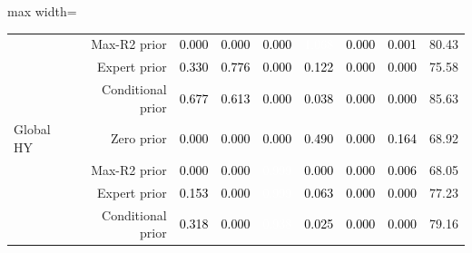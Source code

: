 \documentclass[a4paper,review]{cas-sc}
\begin{document}
\begin{table}[pos=htbp]
\begin{adjustbox}{max width=\linewidth}
\begin{tabular}{lrrrrrrrr}
 & Max-R2 prior & \cellcolor[HTML]{FFFFFF}\textcolor{black}{0.000} & \cellcolor[HTML]{FFFFFF}\textcolor{black}{0.000} & \cellcolor[HTML]{FFFFFF}\textcolor{black}{0.000} & \cellcolor[HTML]{C13639}\textcolor{white}{1.068} & \cellcolor[HTML]{FFFFFF}\textcolor{black}{0.000} & \cellcolor[HTML]{F7F6F6}\textcolor{black}{0.001} & 80.43 \\
 & Expert prior & \cellcolor[HTML]{FCD5BF}\textcolor{black}{0.330} & \cellcolor[HTML]{E27B62}\textcolor{black}{0.776} & \cellcolor[HTML]{FFFFFF}\textcolor{black}{0.000} & \cellcolor[HTML]{F9EBE3}\textcolor{black}{0.122} & \cellcolor[HTML]{FFFFFF}\textcolor{black}{0.000} & \cellcolor[HTML]{FFFFFF}\textcolor{black}{0.000} & 75.58 \\
 & Conditional prior & \cellcolor[HTML]{EC9374}\textcolor{black}{0.677} & \cellcolor[HTML]{F2A17F}\textcolor{black}{0.613} & \cellcolor[HTML]{FFFFFF}\textcolor{black}{0.000} & \cellcolor[HTML]{F8F3F0}\textcolor{black}{0.038} & \cellcolor[HTML]{FFFFFF}\textcolor{black}{0.000} & \cellcolor[HTML]{FFFFFF}\textcolor{black}{0.000} & 85.63 \\
Global HY & Zero prior & \cellcolor[HTML]{FFFFFF}\textcolor{black}{0.000} & \cellcolor[HTML]{FFFFFF}\textcolor{black}{0.000} & \cellcolor[HTML]{FFFFFF}\textcolor{black}{0.000} & \cellcolor[HTML]{F7B99C}\textcolor{black}{0.490} & \cellcolor[HTML]{FFFFFF}\textcolor{black}{0.000} & \cellcolor[HTML]{FAE8DE}\textcolor{black}{0.164} & 68.92 \\
 & Max-R2 prior & \cellcolor[HTML]{FFFFFF}\textcolor{black}{0.000} & \cellcolor[HTML]{FFFFFF}\textcolor{black}{0.000} & \cellcolor[HTML]{C94741}\textcolor{white}{0.999} & \cellcolor[HTML]{FFFFFF}\textcolor{black}{0.000} & \cellcolor[HTML]{FFFFFF}\textcolor{black}{0.000} & \cellcolor[HTML]{F7F6F6}\textcolor{black}{0.006} & 68.05 \\
 & Expert prior & \cellcolor[HTML]{FAE8DE}\textcolor{black}{0.153} & \cellcolor[HTML]{FFFFFF}\textcolor{black}{0.000} & \cellcolor[HTML]{C94741}\textcolor{white}{0.999} & \cellcolor[HTML]{F8F1ED}\textcolor{black}{0.063} & \cellcolor[HTML]{FFFFFF}\textcolor{black}{0.000} & \cellcolor[HTML]{FFFFFF}\textcolor{black}{0.000} & 77.23 \\
 & Conditional prior & \cellcolor[HTML]{FCD7C2}\textcolor{black}{0.318} & \cellcolor[HTML]{FFFFFF}\textcolor{black}{0.000} & \cellcolor[HTML]{D05548}\textcolor{white}{0.938} & \cellcolor[HTML]{F8F4F2}\textcolor{black}{0.025} & \cellcolor[HTML]{FFFFFF}\textcolor{black}{0.000} & \cellcolor[HTML]{FFFFFF}\textcolor{black}{0.000} & 79.16 \\

\end{tabular}
\end{adjustbox}
\end{table}
\end{document}
